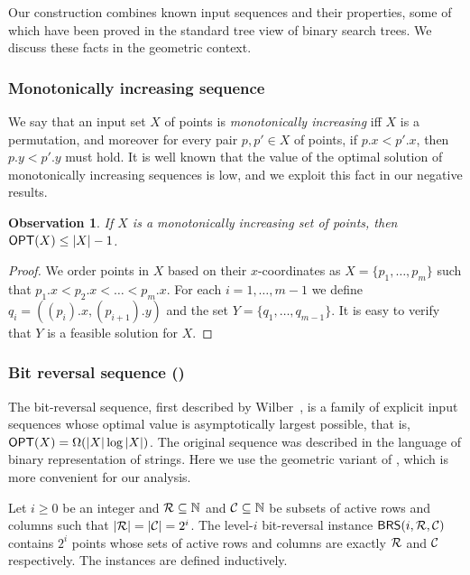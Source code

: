 \documentclass[11pt]{article}
\numberwithin{equation}{section}
\theoremstyle{definition}
\theoremstyle{plain}
\newtheorem{myobs}[theorem]{Observation}
\begin{document}
Our construction combines known input sequences and their properties, some of which have been proved in the standard tree view of binary search trees.  We discuss these facts in the geometric context. 

 \subsubsection{Monotonically increasing sequence} 
 
 We say that an input set $X$ of points is \emph{monotonically increasing} iff $X$ is a permutation, and moreover for every pair $p,p'\in X$ of points, if $p.x <p'.x$, then $p.y<p'.y$ must hold.
It is well known that the value of the optimal solution of monotonically increasing sequences is low, and we exploit this fact in our negative results.
%

\begin{myobs}\label{obs: solution for monotone increasing set}
        If $X$ is a monotonically increasing set of points, then $\mbox{\sf OPT}(X)\leq |X|-1$.
\end{myobs}
 \begin{proof}
We order points in $X$ based on their $x$-coordinates as $X = \{p_1,\ldots, p_m\}$ such that $p_1.x < p_2.x <\ldots < p_m.x$.
For each $i =1,\ldots, m-1$ we define $q_i = ((p_i).x, (p_{i+1}).y)$ and the set $Y = \{q_1,\ldots, q_{m-1}\}$. It is easy to verify that $Y$ is a feasible solution for $X$. 
 \end{proof}



\subsubsection{Bit reversal sequence (\BRS)} 


The bit-reversal sequence, first described by Wilber~\cite{wilber}, is a family of explicit input sequences whose optimal value is asymptotically largest possible, that is, $\mbox{\sf OPT}(X) = \Omega(|X| \log |X|)$. 
The original sequence was described in the language of binary representation of strings. Here we use the geometric variant of \BRS, which is more convenient for our analysis. 

Let $i \geq 0$ be an integer and  ${\mathcal R} \subseteq {\mathbb N}$ and ${\mathcal C} \subseteq {\mathbb N}$ be subsets of active rows and columns such that  $|{\mathcal R}|=|{\mathcal C}|=2^i$. 
The level-$i$ bit-reversal instance ${\sf BRS}(i,{\mathcal R},{\mathcal C})$ contains $2^i$ points whose sets of active rows and columns are exactly ${\mathcal R}$ and ${\mathcal C}$ respectively. 
The instances are defined inductively. 
\end{document}
